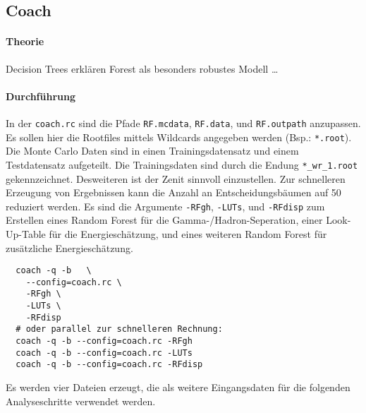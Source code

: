 \subsection{Coach}%
\label{sub:coach}

\paragraph{Theorie}%
\label{par:theorie}
Decision Trees erklären
Forest als besonders robustes Modell \ldots


\paragraph{Durchführung}%
In der \texttt{coach.rc} sind die Pfade
\texttt{RF.mcdata},
\texttt{RF.data},
und \texttt{RF.outpath}
anzupassen.
Es sollen hier die Rootfiles mittels Wildcards angegeben werden
(Bsp.: \texttt{*.root}).
Die Monte Carlo Daten sind in einen Trainingsdatensatz
und einem Testdatensatz aufgeteilt.
Die Trainingsdaten sind durch die Endung
\texttt{*\_wr\_1.root} gekennzeichnet.
Desweiteren ist der Zenit sinnvoll einzustellen.
Zur schnelleren Erzeugung von Ergebnissen kann die Anzahl an
Entscheidungsbäumen auf \num{50}
reduziert werden.
Es sind die Argumente
\texttt{-RFgh}, \texttt{-LUTs}, und \texttt{-RFdisp}
zum Erstellen eines Random Forest für die Gamma-/Hadron-Seperation,
einer Look-Up-Table für die Energieschätzung,
und eines weiteren Random Forest für zusätzliche Energieschätzung.

\begin{lstlisting}
  coach -q -b	\
    --config=coach.rc \
    -RFgh \
    -LUTs \
    -RFdisp
  # oder parallel zur schnelleren Rechnung:
  coach -q -b --config=coach.rc -RFgh
  coach -q -b --config=coach.rc -LUTs
  coach -q -b --config=coach.rc -RFdisp
\end{lstlisting}

Es werden vier Dateien erzeugt,
die als weitere Eingangsdaten für die folgenden Analyseschritte verwendet
werden.
